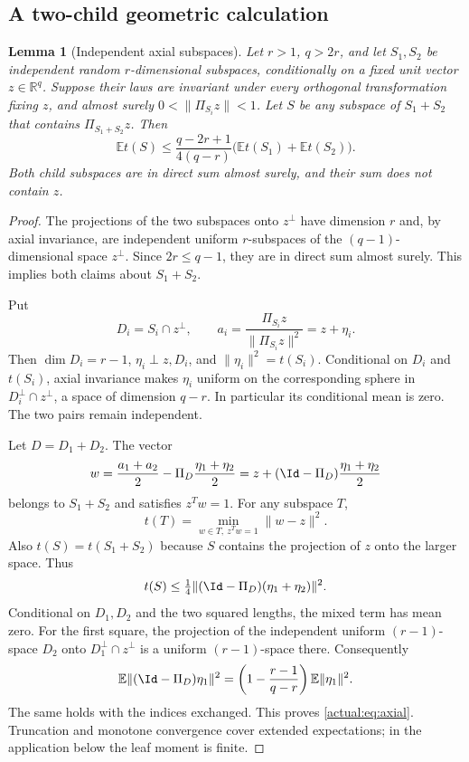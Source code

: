 \documentclass[11pt,oneside,openany,a4paper]{book}
\numberwithin{equation}{chapter}
\newtheorem{lemma}[theorem]{Lemma}
\theoremstyle{definition}
\theoremstyle{remark}
\newcommand{\R}{\mathbb R}\newcommand{\E}{\mathbb E}\newcommand{\Prb}{\mathbb P}\newcommand{\PP}{\mathbb P}
\begin{document}
\subsection{A two-child geometric calculation}
\begin{lemma}[Independent axial subspaces]\label{actual:lem:axial}
Let $r>1$, $q>2r$, and let $S_1,S_2$ be independent random $r$-dimensional subspaces, conditionally on a fixed unit vector $z\in\R^q$. Suppose their laws are invariant under every orthogonal transformation fixing $z$, and almost surely $0<\|\Pi_{S_i}z\|<1$. Let $S$ be any subspace of $S_1+S_2$ that contains $\Pi_{S_1+S_2}z$. Then
\begin{equation}\label{actual:eq:axial}
 \E t(S)\le\frac{q-2r+1}{4(q-r)}
                   \bigl(\E t(S_1)+\E t(S_2)\bigr).
\end{equation}
Both child subspaces are in direct sum almost surely, and their sum does not contain $z$.
\end{lemma}
\begin{proof}
The projections of the two subspaces onto $z^\perp$ have dimension $r$ and, by axial invariance, are independent uniform $r$-subspaces of the $(q-1)$-dimensional space $z^\perp$. Since $2r\le q-1$, they are in direct sum almost surely. This implies both claims about $S_1+S_2$.

Put
\[
 D_i=S_i\cap z^\perp,\qquad
 a_i=\frac{\Pi_{S_i}z}{\|\Pi_{S_i}z\|^2}=z+\eta_i.
\]
Then $\dim D_i=r-1$, $\eta_i\perp z,D_i$, and
$\|\eta_i\|^2=t(S_i)$. Conditional on $D_i$ and $t(S_i)$, axial invariance makes $\eta_i$ uniform on the corresponding sphere in
$D_i^\perp\cap z^\perp$, a space of dimension $q-r$. In particular its conditional mean is zero. The two pairs remain independent.

Let $D=D_1+D_2$. The vector
\[
 w=\frac{a_1+a_2}{2}-\Pi_D\frac{\eta_1+\eta_2}{2}
   =z+(\Id-\Pi_D)\frac{\eta_1+\eta_2}{2}
\]
belongs to $S_1+S_2$ and satisfies $z^Tw=1$. For any subspace $T$,
\[
 t(T)=\min_{w\in T,\ z^Tw=1}\|w-z\|^2.
\]
Also $t(S)=t(S_1+S_2)$ because $S$ contains the projection of $z$ onto the larger space. Thus
\[
 t(S)\le\tfrac14\|(\Id-\Pi_D)(\eta_1+\eta_2)\|^2.
\]
Conditional on $D_1,D_2$ and the two squared lengths, the mixed term has mean zero. For the first square, the projection of the independent uniform $(r-1)$-space $D_2$ onto $D_1^\perp\cap z^\perp$ is a uniform $(r-1)$-space there. Consequently
\[
 \E\|(\Id-\Pi_D)\eta_1\|^2
 =\left(1-\frac{r-1}{q-r}\right)\E\|\eta_1\|^2.
\]
The same holds with the indices exchanged. This proves \eqref{actual:eq:axial}. Truncation and monotone convergence cover extended expectations; in the application below the leaf moment is finite.
\end{proof}
\end{document}
